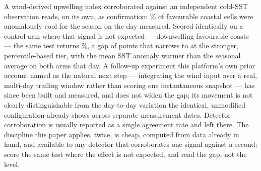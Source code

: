 A wind-derived upwelling index corroborated against an independent cold-SST
observation reads, on its own, as confirmation: \UpwellFavourWeak{}\% of
favourable coastal cells were anomalously cool for the season on the day
measured. Scored identically on a control arm where that signal is not
expected --- downwelling-favourable coasts --- the same test returns
\UpwellControlWeak{}\%, a gap of \UpwellGapWeak{} points that narrows to
\UpwellGapStrong{} at the stronger, percentile-based tier, with the mean SST
anomaly warmer than the seasonal average on both arms that day. A follow-up
experiment this platform's own prior account named as the natural next step
--- integrating the wind input over a real, multi-day trailing window rather
than scoring one instantaneous snapshot --- has since been built and
measured, and does not widen the gap; its movement is not clearly
distinguishable from the day-to-day variation the identical, unmodified
configuration already shows across separate measurement dates. Detector
corroboration is usually reported as a single agreement rate and left there.
The discipline this paper applies, twice, is cheap, computed from data
already in hand, and available to any detector that corroborates one signal
against a second: score the same test where the effect is not expected, and
read the gap, not the level.
